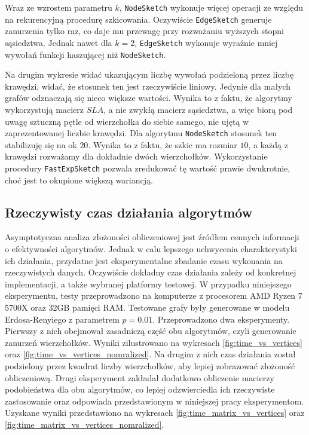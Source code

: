 Wraz ze wzrostem parametru $k$, \texttt{NodeSketch} wykonuje więcej operacji ze względu na rekurencyjną procedurę szkicowania. Oczywiście \texttt{EdgeSketch} generuje zanurzenia tylko raz, co daje mu przewagę przy rozważaniu wyższych stopni sąsiedztwa. Jednak nawet dla $k = 2$, \texttt{EdgeSketch} wykonuje wyraźnie mniej wywołań funkcji haszującej niż \texttt{NodeSketch}.

Na drugim wykresie widać ukazującym liczbę wywołań podzieloną przez liczbę krawędzi, widać, że stosunek ten jest rzeczywiście liniowy. Jedynie dla małych grafów odznaczają się nieco większe wartości. Wynika to z faktu, że algorytmy wykorzystują macierz $SLA$, a nie zwykłą macierz sąsiedztwa, a więc biorą pod uwagę sztuczną pętle od wierzchołka do siebie samego, nie ujętą w zaprezentowanej liczbie krawędzi. Dla algorytmu \texttt{NodeSketch} stosunek ten stabilizuję się na ok $20$. Wynika to z faktu, że szkic ma rozmiar $10$, a każdą z krawędzi rozważamy dla dokładnie dwóch wierzchołków. Wykorzystanie procedury \texttt{FastExpSketch} pozwala zredukować tę wartość prawie dwukrotnie, choć jest to okupione większą wariancją.  

\subsection{Rzeczywisty czas działania algorytmów}

Asymptotyczna analiza złożoności obliczeniowej jest źródłem cennych informacji o efektywności algorytmów. Jednak w calu lepszego uchwycenia charakterystyki ich działania, przydatne jest eksperymentalne zbadanie czasu wykonania na rzeczywistych danych. Oczywiście dokładny czas działania zależy od konkretnej implementacji, a także wybranej platformy testowej. W przypadku niniejszego eksperymentu, testy przeprowadzono na komputerze z procesorem AMD Ryzen 7 5700X oraz 32GB pamięci RAM. Testowane grafy były generowane w modelu Erdosa-Renyiego z parametrem $p = 0.01$. Przeprowadzono dwa eksperymenty. Pierwszy z nich obejmował zasadniczą część obu algorytmów, czyli generowanie zanurzeń wierzchołków. Wyniki zilustrowano na wykresach \ref{fig:time_vs_vertices} oraz \ref{fig:time_vs_vertices_nomralized}. Na drugim z nich czas działania został podzielony przez kwadrat liczby wierzchołków, aby lepiej zobrazować złożoność obliczeniową. Drugi eksperyment zakładał dodatkowo obliczenie macierzy podobieństwa dla obu algorytmów, co lepiej odzwierciedla ich rzeczywiste zastosowanie oraz odpowiada przedstawionym w niniejszej pracy eksperymentom. Uzyskane wyniki przedstawiono na wykresach \ref{fig:time_matrix_vs_vertices} oraz \ref{fig:time_matrix_vs_vertices_nomralized}.

